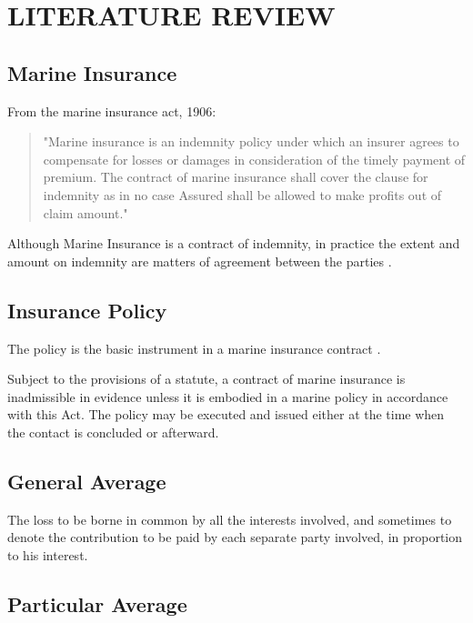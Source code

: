 \setlength{\footskip}{8mm}

\chapter{LITERATURE REVIEW} 
\label{ch:literature-review}


\section{Marine Insurance}

From the marine insurance act, 1906:

\begin{quote}
"Marine insurance is an indemnity policy under which an insurer agrees to compensate for losses or damages in consideration of the timely payment of premium. The contract of marine insurance shall cover the clause for indemnity as in no case Assured shall be allowed to make profits out of claim amount." 
\end{quote}\cite{marineInsuranceAct55} 


Although Marine Insurance is a contract of indemnity, in practice the extent and amount on indemnity are matters of agreement between the parties 
\cite{irvinvmanning} \cite{goolevocean}. 

\section{Insurance Policy}

The policy is the basic instrument in a marine insurance contract  \cite{marineInsuranceAct55}.

Subject to the provisions of a statute, a contract of marine insurance is inadmissible in evidence unless it is embodied in a marine policy in accordance with this Act. The policy may be executed and issued either at the time when the contact is concluded or afterward. 

\section{General Average}

The loss to be  borne in common by all the interests involved, and sometimes to denote the contribution to be paid by each separate party involved, in proportion to his interest. \cite{marineInsuranceAct55}

\section{Particular Average}

